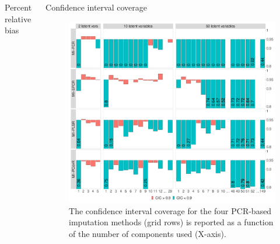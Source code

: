 \documentclass{beamer}\usepackage[]{graphicx}\usepackage[]{xcolor}
\makeatletter
\def\maxwidth{ %
  \ifdim\Gin@nat@width>\linewidth
    \linewidth
  \else
    \Gin@nat@width
  \fi
}
\newenvironment{knitrout}{}{} %
\makeatother
\begin{document}
\begin{frame}[fragile]
\begin{columns}
\begin{column}{.46\textwidth}
\begin{block}{Percent relative bias}
    \end{block}
    
  \end{column}  


  \begin{column}{.46\textwidth}

    \begin{block}{Confidence interval coverage}
      
      \begin{figure}
        \centering
\begin{knitrout}
\color{fgcolor}

{\centering \includegraphics[width=\maxwidth]{figure/plot-cic-1} 

}


\end{knitrout}
          \caption{
            \label{fig:prb} 
            The confidence interval coverage for the four PCR-based imputation methods (grid rows) is reported as a function of the number of components used (X-axis).
            }
        \end{figure}
    
    \end{block}
    \end{column}

  \end{columns}


\end{frame}
\end{document}
